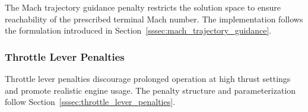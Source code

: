 The Mach trajectory guidance penalty restricts the solution space to ensure reachability of the prescribed terminal Mach number. The implementation follows the formulation introduced in Section~\ref{sssec:mach_trajectory_guidance}.

\subsubsection{Throttle Lever Penalties}

Throttle lever penalties discourage prolonged operation at high thrust settings and promote realistic engine usage. The penalty structure and parameterization follow Section~\ref{sssec:throttle_lever_penalties}.
